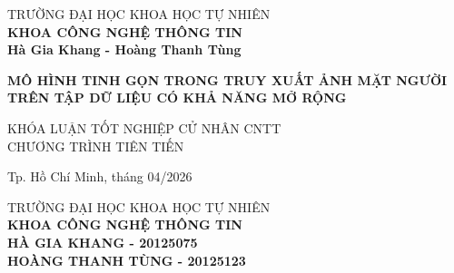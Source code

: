 \begin{titlepage}

\begin{center}
TRƯỜNG ĐẠI HỌC KHOA HỌC TỰ NHIÊN\\
\textbf{KHOA CÔNG NGHỆ THÔNG TIN}\\[2cm]


{ \Large \bfseries Hà Gia Khang - Hoàng Thanh Tùng\\[2cm] } 


{ \Large \bfseries MÔ HÌNH TINH GỌN TRONG TRUY XUẤT ẢNH MẶT NGƯỜI TRÊN TẬP DỮ LIỆU CÓ KHẢ NĂNG MỞ RỘNG  \\[3cm]} 


\large KHÓA LUẬN TỐT NGHIỆP CỬ NHÂN CNTT\\
\large CHƯƠNG TRÌNH TIÊN TIẾN\\



\vfill
Tp. Hồ Chí Minh, tháng 04/2026

\end{center}

\pagebreak



\begin{center}

TRƯỜNG ĐẠI HỌC KHOA HỌC TỰ NHIÊN\\
\textbf{KHOA CÔNG NGHỆ THÔNG TIN}\\[2cm]


{\large \bfseries HÀ GIA KHANG - 20125075\\} 
{\large \bfseries HOÀNG THANH TÙNG - 20125123\\[2cm]}



\end{center}
\end{titlepage}
